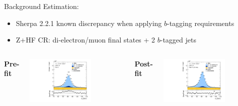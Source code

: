 \documentclass[11pt, xcolor={dvipsnames}, aspectratio=169]{beamer}
\begin{document}
\begin{frame}{Background Estimation: }
  \begin{itemize}
  \item Sherpa 2.2.1 known discrepancy when applying $b$-tagging requirements
  \item Z+HF CR: di-electron/muon final states + 2 $b$-tagged jets
  \end{itemize}

  \vspace*{0.5em}

  \begin{columns}[onlytextwidth]
    \centering

    \textbf{Pre-fit}

    \includegraphics[width=0.65\textwidth]{zhfcr/Region_BMin0_incJet1_Y2015_DZllbbCR_T2_L2_distmLL_J2_Prefit_fixed}

    \centering

    \textbf{Post-fit}

    \includegraphics[width=0.65\textwidth]{zhfcr/Region_BMin0_incJet1_Y2015_DZllbbCR_T2_L2_distmLL_J2_GlobalFit_conditionnal_mu0_fixed}
  \end{columns}
\end{frame}

\end{document}
